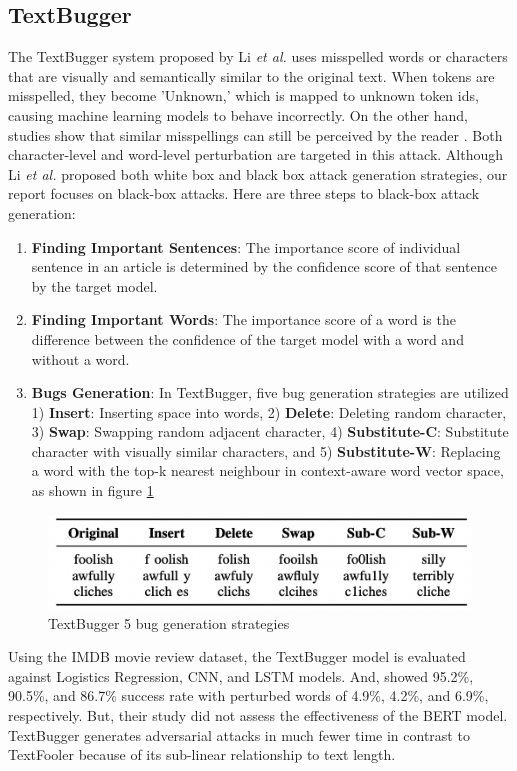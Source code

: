 \documentclass[%
	BCOR=8mm, %
	DIV=12,
	toc=bibliography, %
	toc=listof, %
	oneside, %
	egregdoesnotlikesansseriftitles, %
	]{scrbook}
\begin{document}
\subsection{TextBugger}
\label{subsection:textbugger}
The TextBugger system proposed by Li \textit{et al.} \cite{li_textbugger_2019} uses misspelled words or characters that are visually and semantically similar to the original text. When tokens are misspelled, they become 'Unknown,' which is mapped to unknown token ids, causing machine learning models to behave incorrectly. On the other hand, studies show that similar misspellings can still be perceived by the reader \cite{rawlinson_significance_2007,alzantot_generating_2018}. Both character-level and word-level perturbation are targeted in this attack. Although Li \textit{et al.} \cite{li_textbugger_2019}  proposed both white box and black box attack generation strategies, our report focuses on black-box attacks. Here are three steps to black-box attack generation:
\begin{enumerate}
    \item \textbf{Finding Important Sentences}: The importance score of individual sentence in an article is determined by the confidence score of that sentence by the target model.
    \item \textbf{Finding Important Words}: The importance score of a word is the difference between the confidence of the target model with a word and without a word.
    \item \textbf{Bugs Generation}: In TextBugger, five bug generation strategies are utilized 1) \textbf{Insert}: Inserting space into words, 2) \textbf{Delete}: Deleting random character,
    3) \textbf{Swap}: Swapping random adjacent character, 4) \textbf{Substitute-C}: Substitute character with visually similar characters, and 5)\textbf{ Substitute-W}: Replacing a word with the top-k nearest neighbour in context-aware word vector space, as shown in figure \ref{diag:textbug}
\end{enumerate}

\begin{figure}[H]
    \centering
    \includegraphics[width=.70\textwidth]{img/textbugger_5strat.png}
    \caption[Example of 5 bug generation strategies of TextBugger]{TextBugger 5 bug generation strategies \cite{li_textbugger_2019} }
    \label{diag:textbug}
\end{figure}
Using the IMDB movie review dataset, the TextBugger model is evaluated against Logistics Regression, CNN, and LSTM  models. And, showed 95.2\%, 90.5\%, and 86.7\% success rate with perturbed words of 4.9\%, 4.2\%, and 6.9\%, respectively. But, their study did not assess the effectiveness of the BERT model. TextBugger generates adversarial attacks in much fewer time in contrast to TextFooler because of its sub-linear relationship to text length.
\end{document}
